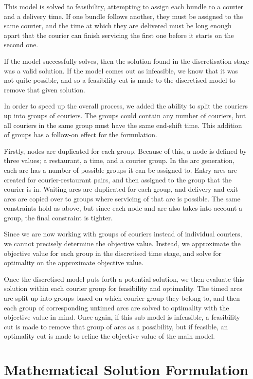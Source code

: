 \documentclass{article}
\begin{document}
This model is solved to feasibility, attempting to assign each bundle to a courier and a delivery time. If one bundle follows another, they must be assigned to the same courier, and the time at which they are delivered must be long enough apart that the courier can finish servicing the first one before it starts on the second one.

If the model successfully solves, then the solution found in the discretisation stage was a valid solution. If the model comes out as infeasible, we know that it was not quite possible, and so a feasibility cut is made to the discretised model to remove that given solution.

In order to speed up the overall process, we added the ability to split the couriers up into groups of couriers. The groups could contain any number of couriers, but all couriers in the same group must have the same end-shift time. This addition of groups has a follow-on effect for the formulation.

Firstly, nodes are duplicated for each group. Because of this, a node is defined by three values; a restaurant, a time, and a courier group. In the arc generation, each arc has a number of possible groups it can be assigned to. Entry arcs are created for courier-restaurant pairs, and then assigned to the group that the courier is in. Waiting arcs are duplicated for each group, and delivery and exit arcs are copied over to groups where servicing of that arc is possible. The same constraints hold as above, but since each node and arc also takes into account a group, the final constraint is tighter.

Since we are now working with groups of couriers instead of individual couriers, we cannot precisely determine the objective value. Instead, we approximate the objective value for each group in the discretised time stage, and solve for optimality on the approximate objective value.

Once the discretised model puts forth a potential solution, we then evaluate this solution within each courier group for feasibility and optimality. The timed arcs are split up into groups based on which courier group they belong to, and then each group of corresponding untimed arcs are solved to optimality with the objective value in mind. Once again, if this sub model is infeasible, a feasibility cut is made to remove that group of arcs as a possibility, but if feasible, an optimality cut is made to refine the objective value of the main model.

\section{Mathematical Solution Formulation}
\end{document}
